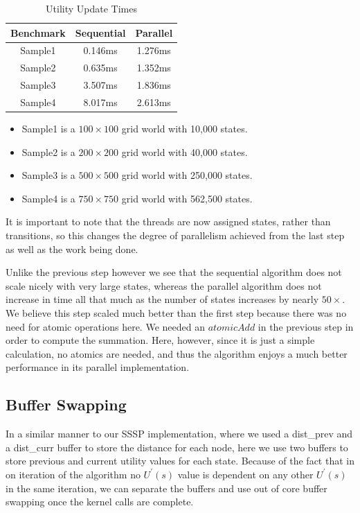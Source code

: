 \documentclass[letterpaper,twocolumn,10pt]{article}
\begin{document}
{\begin{table}[h!]
	\centering
	\caption{Utility Update Times}
	\label{tab:table1}
	\begin{tabular}{ccc}
		\toprule
		Benchmark & Sequential & Parallel\\
		\midrule
		Sample1 & 0.146ms & 1.276ms\\
		Sample2 & 0.635ms & 1.352ms\\
		Sample3 & 3.507ms & 1.836ms\\
		Sample4 & 8.017ms & 2.613ms\\
		\bottomrule
	\end{tabular}
\end{table}

\begin{itemize}
	\item Sample1 is a $100\times100$ grid world with 10,000 states.
	\item Sample2 is a $200\times200$ grid world with 40,000 states.
	\item Sample3 is a $500\times500$ grid world with 250,000 states.
	\item Sample4 is a $750\times750$ grid world with 562,500 states.
\end{itemize}

It is important to note that the threads are now assigned states, rather than transitions, so this changes the degree of parallelism achieved from the last step as well as the work being done.

Unlike the previous step however we see that the sequential algorithm does not scale nicely with very large states, whereas the parallel algorithm does not increase in time all that much as the number of states increases by nearly $50\times$. We believe this step scaled much better than the first step because there was no need for atomic operations here. We needed an $atomicAdd$ in the previous step in order to compute the summation. Here, however, since it is just a simple calculation, no atomics are needed, and thus the algorithm enjoys a much better performance in its parallel implementation.

\subsection{Buffer Swapping}

In a similar manner to our SSSP implementation, where we used a dist\_prev and a dist\_curr buffer to store the distance for each node, here we use two buffers to store previous and current utility values for each state. Because of the fact that in on iteration of the algorithm no $U^\prime(s)$ value is dependent on any other $U^\prime(s)$ in the same iteration, we can separate the buffers and use out of core buffer swapping once the kernel calls are complete.

}
\end{document}
